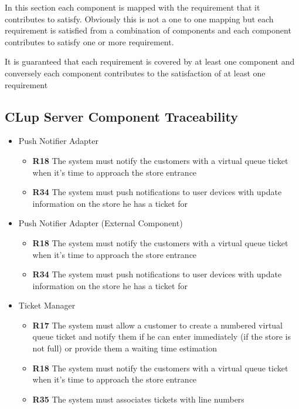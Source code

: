 In this section each component is mapped with the requirement that it contributes to satisfy. Obviously this is not a one to one mapping but each requirement is satisfied from a combination of components and each component contributes to satisfy one or more requirement.

It is guaranteed that each requirement is covered by at least one component and conversely each component contributes to the satisfaction of at least one requirement


\subsection{CLup Server Component Traceability}
\begin{itemize}
    \item Push Notifier Adapter
    \begin{itemize}
        \item \textbf{R18} The system must notify the customers with a virtual queue ticket when it’s time to approach the store entrance
        \item \textbf{R34} The system must push notifications to user devices with update information on the store he has a ticket for
    \end{itemize}
    \item Push Notifier Adapter (External Component)
    \begin{itemize}
        \item \textbf{R18} The system must notify the customers with a virtual queue ticket when it’s time to approach the store entrance
        \item \textbf{R34} The system must push notifications to user devices with update information on the store he has a ticket for
    \end{itemize}
    \item Ticket Manager
    \begin{itemize}
        \item \textbf{R17} The system must allow a customer to create a numbered virtual queue ticket and notify them if he can enter immediately (if the store is not full) or provide them a waiting time estimation
        \item \textbf{R18} The system must notify the customers with a virtual queue ticket when it’s time to approach the store entrance
        \item \textbf{R35} The system must associates tickets with line numbers
    \end{itemize}

\end{itemize}
